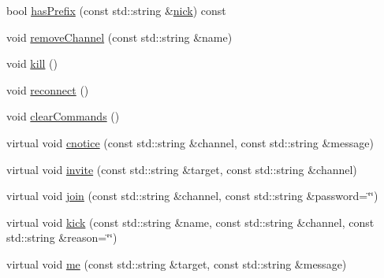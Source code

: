 \begin{DoxyCompactItemize}
\item 
bool \hyperlink{a00055_acdc3b932d6c9df76bdcc3a020919dcf1}{has\-Prefix} (const std\-::string \&\hyperlink{a00055_acfc30a5f0f0311efbc0c9feda8b7e2ba}{nick}) const 
\item 
void \hyperlink{a00055_a3a686504aa39b910b5bae1bca8b3cd25}{remove\-Channel} (const std\-::string \&name)
\item 
void \hyperlink{a00055_ae7164401432131b17a5830e94c138382}{kill} ()
\item 
void \hyperlink{a00055_a1b2c09f194db19145f45c32883bf6192}{reconnect} ()
\item 
void \hyperlink{a00055_a26e87fcc00d9aeb65dab4ae971a0373a}{clear\-Commands} ()
\item 
virtual void \hyperlink{a00055_adb055098d74e98ddefc0426d1744c489}{cnotice} (const std\-::string \&channel, const std\-::string \&message)
\begin{DoxyCompactList}\small\item\em \end{DoxyCompactList}\item 
virtual void \hyperlink{a00055_a0ffc5a5969f67c6b4308efbb93d6ecfb}{invite} (const std\-::string \&target, const std\-::string \&channel)
\begin{DoxyCompactList}\small\item\em \end{DoxyCompactList}\item 
virtual void \hyperlink{a00055_a17241b2e9ed6d2ec4e91224f1da46fb9}{join} (const std\-::string \&channel, const std\-::string \&password=\char`\"{}\char`\"{})
\begin{DoxyCompactList}\small\item\em \end{DoxyCompactList}\item 
virtual void \hyperlink{a00055_a233d503d78d1002ecf1cbdb06ff85cc5}{kick} (const std\-::string \&name, const std\-::string \&channel, const std\-::string \&reason=\char`\"{}\char`\"{})
\begin{DoxyCompactList}\small\item\em \end{DoxyCompactList}\item 
virtual void \hyperlink{a00055_adb3abea7918638f87e6f32b5017e80cb}{me} (const std\-::string \&target, const std\-::string \&message)
\begin{DoxyCompactList}\small\item\em \end{DoxyCompactList}\item 

\end{DoxyCompactItemize}

